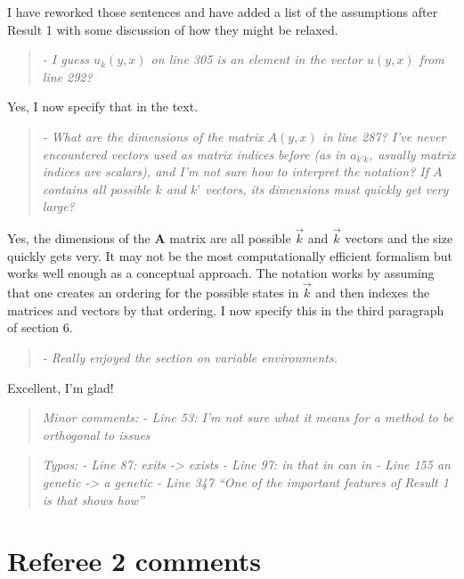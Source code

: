 \documentclass[10pt,parskip=full,foldmarks=off,addrfield=off,backaddress=false,refline=dateleft,letterpaper]{scrlttr2}
\newenvironment{reviewerquote}{\begin{quote}\color{DarkBlue}\itshape}{\end{quote}}
\begin{document}
\begin{letter}
I have reworked those sentences and have added a list of the assumptions after Result 1 with some discussion of how they might be relaxed.

\begin{reviewerquote}
  - I guess $u_k(y,x)$ on line 305 is an element in the vector $u(y,x)$ from line 292?
\end{reviewerquote}

Yes, I now specify that in the text.

\begin{reviewerquote}
  - What are the dimensions of the matrix $A(y,x)$ in line 287? I’ve never encountered vectors used as matrix indices before (as in $a_{k’k}$, usually matrix indices are scalars), and I’m not sure how to interpret the notation? If $A$ contains all possible $k$ and $k’$ vectors, its dimensions must quickly get very large?
\end{reviewerquote}

Yes, the dimensions of the $\mathbf{A}$ matrix are all possible $\vec{k}$ and $\vec{k}$ vectors and the size quickly gets very. It may not be the most computationally efficient formalism but works well enough as a conceptual approach. The notation works by assuming that one creates an ordering for the possible states in $\vec{k}$ and then indexes the matrices and vectors by that ordering. I now specify this in the third paragraph of section 6.

\begin{reviewerquote}
  - Really enjoyed the section on variable environments.
\end{reviewerquote}

Excellent, I'm glad!

\begin{reviewerquote}
Minor comments:
- Line 53: I’m not sure what it means for a method to be orthogonal to issues
\end{reviewerquote}



\begin{reviewerquote}
Typos:
- Line 87: exits -> exists
- Line 97: in that in can in
- Line 155 an genetic -> a genetic
- Line 347 “One of the important features of Result 1 is that shows how”
\end{reviewerquote}

\section{Referee 2 comments}


\end{letter}
\end{document}
